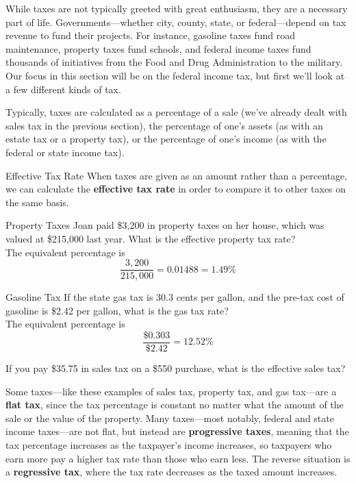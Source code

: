 \setcounter{ExampleCounter}{1}
While taxes are not typically greeted with great enthusiasm, they are a necessary part of life.  Governments---whether city, county, state, or federal---depend on tax revenue to fund their projects.  For instance, gasoline taxes fund road maintenance, property taxes fund schools, and federal income taxes fund thousands of initiatives from the Food and Drug Administration to the military.  Our focus in this section will be on the federal income tax, but first we'll look at a few different kinds of tax.

Typically, taxes are calculated as a percentage of a sale (we've already dealt with sales tax in the previous section), the percentage of one's assets (as with an estate tax or a property tax), or the percentage of one's income (as with the federal or state income tax).

\begin{proc}{Effective Tax Rate}
When taxes are given as an amount rather than a percentage, we can calculate the \textbf{effective tax rate} in order to compare it to other taxes on the same basis.
\end{proc}

\begin{example}[https://www.youtube.com/watch?v=QjjpqBp5d6w]{Property Taxes}
Joan paid \$3,200 in property taxes on her house, which was valued at \$215,000 last year.  What is the effective property tax rate?\\

The equivalent percentage is \[\dfrac{3,200}{215,000} = 0.01488 = 1.49\%\]
\end{example}

\begin{example}[https://www.youtube.com/watch?v=tyNOEV7Q7xg]{Gasoline Tax}
If the state gas tax is 30.3 cents per gallon, and the pre-tax cost of gasoline is \$2.42 per gallon, what is the gas tax rate?\\

The equivalent percentage is \[\dfrac{\$0.303}{\$2.42} = 12.52\%\]
\end{example}

\begin{try}
If you pay \$35.75 in sales tax on a \$550 purchase, what is the effective sales tax?
\end{try}

Some taxes---like these examples of sales tax, property tax, and gas tax---are a \textbf{flat tax}, since the tax percentage is constant no matter what the amount of the sale or the value of the property.  Many taxes---most notably, federal and state income taxes---are not flat, but instead are \textbf{progressive taxes}, meaning that the tax percentage increases as the taxpayer's income increases, so taxpayers who earn more pay a higher tax rate than those who earn less.  The reverse situation is a \textbf{regressive tax}, where the tax rate decreases as the taxed amount increases.

